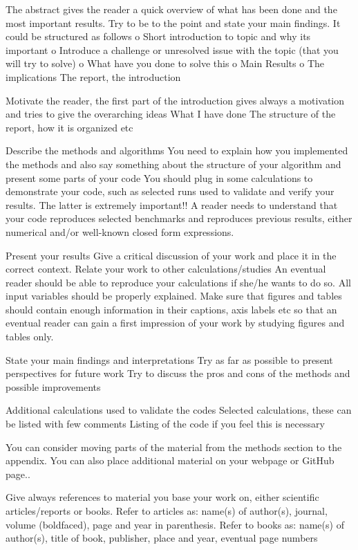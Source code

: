 \documentclass{article}
\begin{document}
The abstract gives the reader a quick overview of what has been done and the most important results. Try to be to the point and state your main findings. It could be structured as follows o Short introduction to topic and why its important o Introduce a challenge or unresolved issue with the topic (that you will try to solve) o What have you done to solve this o Main Results o The implications
The report, the introduction

Motivate the reader, the first part of the introduction gives always a motivation and tries to give the overarching ideas
What I have done
The structure of the report, how it is organized etc

Describe the methods and algorithms
You need to explain how you implemented the methods and also say something about the structure of your algorithm and present some parts of your code
You should plug in some calculations to demonstrate your code, such as selected runs used to validate and verify your results. The latter is extremely important!! A reader needs to understand that your code reproduces selected benchmarks and reproduces previous results, either numerical and/or well-known closed form expressions.

Present your results
Give a critical discussion of your work and place it in the correct context.
Relate your work to other calculations/studies
An eventual reader should be able to reproduce your calculations if she/he wants to do so. All input variables should be properly explained.
Make sure that figures and tables should contain enough information in their captions, axis labels etc so that an eventual reader can gain a first impression of your work by studying figures and tables only.

    State your main findings and interpretations
    Try as far as possible to present perspectives for future work
    Try to discuss the pros and cons of the methods and possible improvements

Additional calculations used to validate the codes
Selected calculations, these can be listed with few comments
Listing of the code if you feel this is necessary

You can consider moving parts of the material from the methods section to the appendix. You can also place additional material on your webpage or GitHub page..

Give always references to material you base your work on, either scientific articles/reports or books.
Refer to articles as: name(s) of author(s), journal, volume (boldfaced), page and year in parenthesis.
Refer to books as: name(s) of author(s), title of book, publisher, place and year, eventual page numbers
\end{document}
